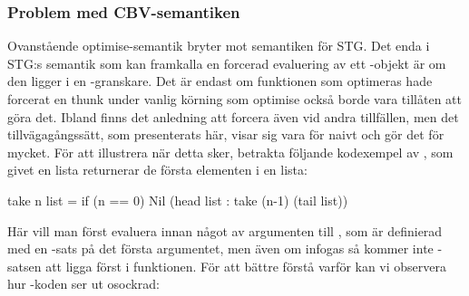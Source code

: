 \documentclass[../Optimise]{subfiles}
\begin{document}
%


\subsubsection{Problem med CBV-semantiken}
\label{CBV:Problem}

Ovanstående optimise-semantik bryter mot semantiken för STG. 
Det enda i STG:s semantik som kan framkalla en forcerad evaluering av ett
-objekt är om den ligger i en -granskare. 
Det är endast om funktionen som optimeras hade forcerat en thunk under vanlig 
körning som optimise också borde vara tillåten att göra det. Ibland finns 
det anledning  att forcera även vid andra tillfällen, men det tillvägagångssätt,
som presenterats här, visar sig vara för naivt och gör det för mycket. För
att illustrera när detta sker, betrakta följande kodexempel av ,
som givet en lista returnerar de första  elementen i en lista:

\begin{codeEx}
take n list = if (n == 0) 
                 Nil 
                 (head list : take (n-1) (tail list))
\end{codeEx}
Här vill man först evaluera  innan något av argumenten till , 
som är definierad med en -sats på det första argumentet, men även om
 infogas så kommer inte -satsen att ligga först i funktionen. För att bättre 
förstå varför kan vi observera hur -koden ser ut osockrad:
\end{document}
